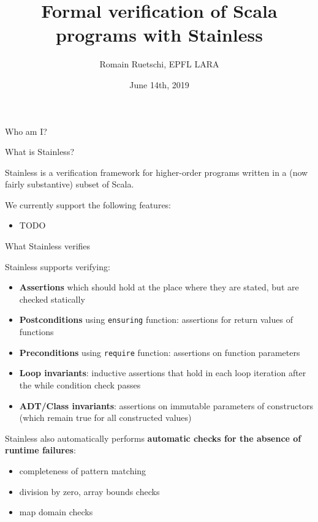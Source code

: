 \documentclass[
  ignorenonframetext,
]{beamer}
\title{Formal verification of Scala programs with Stainless}
\author{Romain Ruetschi, EPFL LARA}
\date{June 14th, 2019}
\providecommand{\tightlist}{%
  \setlength{\itemsep}{0pt}\setlength{\parskip}{0pt}}
\begin{document}
\frame{\titlepage}

\begin{frame}{Who am I?}
\protect\hypertarget{who-am-i}{}

\end{frame}

\begin{frame}{What is Stainless?}
\protect\hypertarget{what-is-stainless}{}

Stainless is a verification framework for higher-order programs written
in a (now fairly substantive) subset of Scala.

We currently support the following features:

\begin{itemize}
\tightlist
\item
  TODO
\end{itemize}

\end{frame}

\begin{frame}[fragile]{What Stainless verifies}
\protect\hypertarget{what-stainless-verifies}{}

Stainless supports verifying:

\begin{itemize}
\tightlist
\item
  \textbf{Assertions} which should hold at the place where they are
  stated, but are checked statically
\item
  \textbf{Postconditions} using \texttt{ensuring} function: assertions
  for return values of functions
\item
  \textbf{Preconditions} using \texttt{require} function: assertions on
  function parameters
\item
  \textbf{Loop invariants}: inductive assertions that hold in each loop
  iteration after the while condition check passes
\item
  \textbf{ADT/Class invariants}: assertions on immutable parameters of
  constructors (which remain true for all constructed values)
\end{itemize}

\end{frame}

\begin{frame}

Stainless also automatically performs \textbf{automatic checks for the
absence of runtime failures}:

\begin{itemize}
\tightlist
\item
  completeness of pattern matching
\item
  division by zero, array bounds checks
\item
  map domain checks
\end{itemize}

\end{frame}
\end{document}
